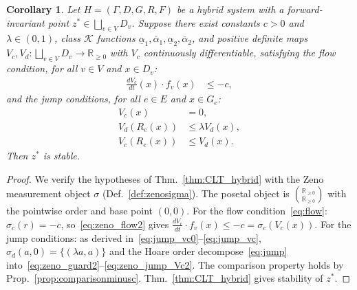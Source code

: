 \documentclass[letterpaper, 10 pt, conference]{IEEEconf}
\newtheorem{cor}[thm]{Corollary}
\theoremstyle{definition}
\newcommand{\maps}{\colon}
\newcommand{\R}{\mathbb R}
\newcommand{\K}{\mathcal K}
\begin{document}
\begin{cor}\label{cor:zenostability}
    Let $H = (\Gamma, D, G, R, F)$ be a hybrid system with a forward-invariant point $z^* \in \bigsqcup_{v \in V} D_v$. Suppose there exist constants $c > 0$ and $\lambda \in (0,1)$, class $\K$ functions $\underline{\alpha}_1, \overline{\alpha}_1, \underline{\alpha}_2, \overline{\alpha}_2$, and positive definite maps $V_c, V_d \maps \bigsqcup_{v \in V} D_v \to \R_{\geq 0}$ with $V_c$ continuously differentiable, satisfying 
    the flow condition, for all $v \in V$ and $x \in D_v$:
    \begin{align}
        \frac{dV_c}{dt}(x) \cdot f_v(x) &\leq -c, \label{eq:zeno_flow2}
    \end{align}
    and the jump conditions, for all $e \in E$ and $x \in G_e$:
    \begin{align}
        V_c(x) &= 0, \label{eq:zeno_guard2} \\
        V_d(R_e(x)) &\leq \lambda  V_d(x), \label{eq:zeno_jump_Vd2} \\
        V_c(R_e(x)) &\leq V_d(x). \label{eq:zeno_jump_Vc2}
    \end{align}
    Then $z^*$ is stable.
\end{cor}
\begin{proof}
    We verify the hypotheses of Thm.~\ref{thm:CLT_hybrid} with the Zeno measurement object $\sigma$ (Def.~\ref{def:zenosigma}). The posetal object is $\binom{\R_{\geq 0}}{\R_{\geq 0}}$ with the pointwise order and base point $(0,0)$. 
    For the flow condition~\eqref{eq:flow}: $\sigma_c(r) = -c$, so~\eqref{eq:zeno_flow2} gives $\frac{dV_c}{dt} \cdot f_v(x) \leq -c = \sigma_c(V_c(x))$. For the jump conditions: as derived in~\eqref{eq:jump_vc0}--\eqref{eq:jump_vc}, $\sigma_d(a,0) = \{(\lambda a, a)\}$ and the Hoare order decompose~\eqref{eq:jump} into~\eqref{eq:zeno_guard2}--\eqref{eq:zeno_jump_Vc2}. The comparison property holds by Prop.~\ref{prop:comparisonminusc}. Thm.~\ref{thm:CLT_hybrid} gives stability of $z^*$.
\end{proof}
\end{document}
